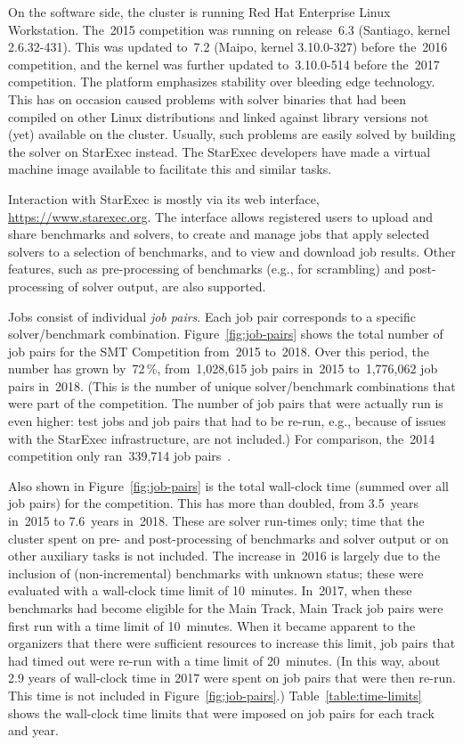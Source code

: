 \documentclass[dvipsnames,table,twoside,11pt]{article}
\newcommand{\maintrack}{Main Track\xspace}
\begin{document}
On the software side, the cluster is running Red Hat Enterprise Linux
Workstation.  The~2015 competition was running on release~6.3
(Santiago, kernel 2.6.32-431).  This was updated to~7.2 (Maipo, kernel
3.10.0-327) before the~2016 competition, and the kernel was further
updated to~3.10.0-514 before the~2017 competition.  The platform
emphasizes stability over bleeding edge technology.  This has on
occasion caused problems with solver binaries that had been compiled
on other Linux distributions and linked against library versions not
(yet) available on the cluster.  Usually, such problems are easily
solved by building the solver on StarExec instead.  The StarExec
developers have made a virtual machine image available to facilitate
this and similar tasks.

Interaction with StarExec is mostly via its web interface,
\url{https://www.starexec.org}.  The interface allows registered users
to upload and share benchmarks and solvers, to create and manage jobs
that apply selected solvers to a selection of benchmarks, and to view
and download job results.  Other features, such as pre-processing of
benchmarks (e.g., for scrambling) and post-processing of solver
output, are also supported.

Jobs consist of individual \emph{job pairs}.  Each job pair
corresponds to a specific solver/benchmark combination.
Figure~\ref{fig:job-pairs} shows the total number of job pairs for the
SMT Competition from~2015 to~2018.  Over this period, the number has
grown by~72\,\%, from~1,028,615 job pairs in~2015 to~1,776,062 job
pairs in~2018.  (This is the number of unique solver/benchmark
combinations that were part of the competition.  The number of job
pairs that were actually run is even higher: test jobs and job pairs
that had to be re-run, e.g., because of issues with the StarExec
infrastructure, are not included.)  For comparison, the~2014
competition only ran~339,714 job pairs~\cite{CDW14}.

Also shown in Figure~\ref{fig:job-pairs} is the total wall-clock time
(summed over all job pairs) for the competition.  This has more than
doubled, from 3.5~years in~2015 to 7.6~years in~2018.  These are
solver run-times only; time that the cluster spent on pre- and
post-processing of benchmarks and solver output or on other auxiliary
tasks is not included.  The increase in~2016 is largely due to the
inclusion of (non-incremental) benchmarks with unknown status; these
were evaluated with a wall-clock time limit of 10~minutes.  In~2017,
when these benchmarks had become eligible for the \maintrack,
\maintrack job pairs were first run with a time limit of 10~minutes.
When it became apparent to the organizers that there were sufficient
resources to increase this limit, job pairs that had timed out were
re-run with a time limit of 20~minutes.  (In this way, about 2.9 years
of wall-clock time in 2017 were spent on job pairs that were then
re-run.  This time is not included in Figure~\ref{fig:job-pairs}.)
Table~\ref{table:time-limits} shows the wall-clock time limits that
were imposed on job pairs for each track and year.
\end{document}
